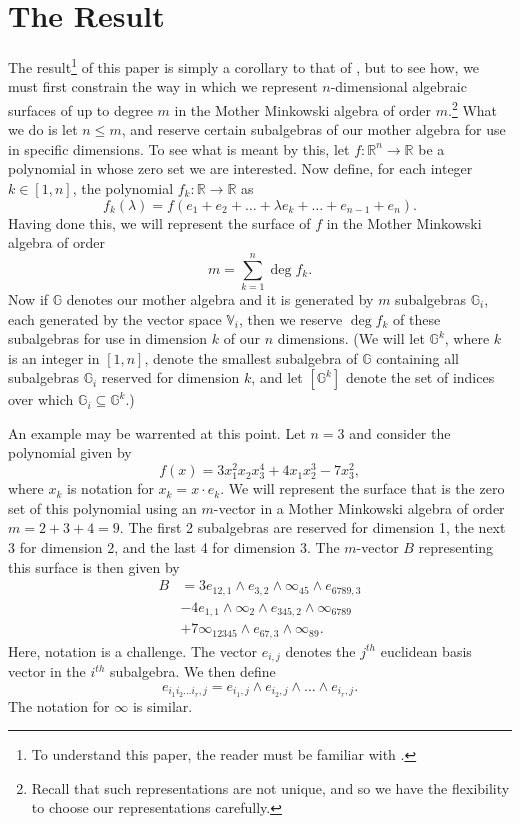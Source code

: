 \documentclass{birkjour}
\theoremstyle{definition}
\theoremstyle{remark}
\numberwithin{equation}{section}
\newcommand{\R}{\mathbb{R}}
\newcommand{\G}{\mathbb{G}}
\newcommand{\V}{\mathbb{V}}
\newcommand{\nvai}{\infty}
\begin{document}
\section{The Result}

The result\footnote{To understand this paper, the reader must be familiar
with \cite{Parkin13}.} of this paper is simply a corollary to that of \cite{Parkin13}, but to see how,
we must first constrain the way in which we represent $n$-dimensional algebraic surfaces of up to degree $m$
in the Mother Minkowski algebra of order $m$.\footnote{Recall that such representations are not unique, and so
we have the flexibility to choose our representations carefully.} What we do is let $n\leq m$, and
reserve certain subalgebras of our mother algebra for use in specific dimensions.
To see what is meant by this, let $f:\R^n\to\R$ be a polynomial in whose zero set
we are interested.  Now define, for each integer $k\in[1,n]$, the polynomial $f_k:\R\to\R$ as
\begin{equation*}
f_k(\lambda)=f(e_1+e_2+\dots+\lambda e_k+\dots +e_{n-1}+e_n).
\end{equation*}
Having done this, we will represent the
surface of $f$ in the Mother Minkowski algebra of order
\begin{equation*}
m=\sum_{k=1}^n\deg f_k.
\end{equation*}
Now if $\G$ denotes our mother algebra and it is generated by $m$ subalgebras $\G_i$,
each generated by the vector space $\V_i$, then we reserve $\deg f_k$
of these subalgebras for use in dimension $k$ of our $n$ dimensions.
(We will let $\G^k$, where $k$ is an integer in $[1,n]$, denote the smallest
subalgebra of $\G$ containing all subalgebras $\G_i$ reserved for dimension $k$,
and let $[\G^k]$ denote the set of indices over which $\G_i\subseteq\G^k$.)

An example may be warrented at this point.  Let $n=3$ and consider the
polynomial given by
\begin{equation}\label{equ_example_poly}
f(x) = 3x_1^2x_2x_3^4 + 4x_1x_2^3 - 7x_3^2,
\end{equation}
where $x_k$ is notation for $x_k=x\cdot e_k$.  We will represent the
surface that is the zero set of this polynomial using an $m$-vector
in a Mother Minkowski algebra of order $m=2+3+4=9$.  The first
2 subalgebras are reserved for dimension 1, the next 3 for dimension
2, and the last 4 for dimension 3.  The $m$-vector $B$
representing this surface is then given by
\begin{align}
B &= 3e_{12,1}\wedge e_{3,2}\wedge \nvai_{45} \wedge e_{6789,3}\nonumber \\
 &- 4e_{1,1}\wedge\nvai_2\wedge e_{345,2}\wedge\nvai_{6789}\nonumber \\
 &+7\nvai_{12345}\wedge e_{67,3}\wedge\nvai_{89}.\label{equ_B_example}
\end{align}
Here, notation is a challenge.  The vector $e_{i,j}$ denotes the $j^{th}$ euclidean basis vector
in the $i^{th}$ subalgebra.  We then define
\begin{equation*}
e_{i_1i_2\dots i_r,j} = e_{i_1,j}\wedge e_{i_2,j}\wedge\dots\wedge e_{i_r,j}.
\end{equation*}
The notation for $\nvai$ is similar.
\end{document}
